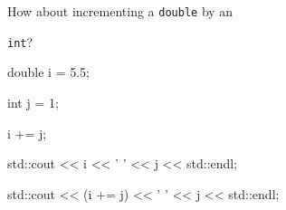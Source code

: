 How about incrementing a \texttt{double} by an

\texttt{int}?

\begin{console}

double i = 5.5;

int j = 1;

i += j;

std::cout << i << ' ' << j << std::endl;

std::cout << (i += j) << ' ' << j << std::endl;

\end{console}

